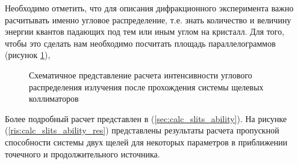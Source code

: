  Необходимо отметить, что для описания дифракционного эксперимента важно расчитывать именно
 угловое распределение, т.е. знать количество и величину энергии квантов падающих под тем
 или иным углом на кристалл. Для того, чтобы это сделать нам необходимо посчитать площадь параллелограммов
 (рисунок \ref{ris:how_many_quants_use_parallelogr}),

 \begin{figure}[H]
   \centering
   \hfill
   \caption{Схематичное представление расчета интенсивности углового
   распределения излучения после прохождения системы щелевых коллиматоров}
   \label{ris:how_many_quants_use_parallelogr}
 \end{figure}
Более подробный расчет представлен в (\ref{sec:calc_slits_ability}).
На рисунке (\ref{ris:calc_slits_ability_res}) представлены результаты расчета пропускной способности системы двух щелей для некоторых параметров в
приближении точечного и продолжительного источника.

